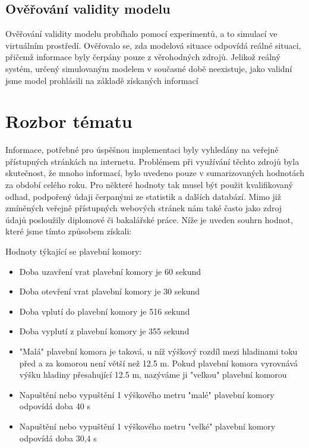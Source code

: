 \documentclass[11pt,a4paper]{article}
\begin{document}
    \subsection{Ověřování validity modelu}

      Ověřování validity modelu probíhalo pomocí experimentů, a to simulací ve virtuálním prostředí. Ověřovalo se,
      zda modelová situace odpovídá reálné situaci, přičemž informace
      byly čerpány pouze z věrohodných zdrojů. Jelikož reálný systém, určený simulovaným modelem v
      současné době neexistuje, jako validní jsme model prohlásili na základě získaných
      informací

  \section{Rozbor tématu}

    Informace, potřebné pro úspěšnou implementaci byly vyhledány na veřejně přístupných stránkách
    na internetu. Problémem při využívání těchto zdrojů byla skutečnost, že mnoho informací,
    bylo uvedeno pouze v sumarizovaných hodnotách za období celého roku. Pro některé hodnoty tak musel být použit kvalifikovaný odhad, podpořený údaji čerpanými ze statistik a dalších databází. Mimo již zmíněných veřejně přístupných webových stránek nám také často jako zdroj údajů posloužily diplomové či bakalářské práce. Níže je uveden souhrn hodnot, které jsme tímto způsobem získali:

    \noindent
    Hodnoty týkající se plavební komory:

    \begin{itemize}
      \item Doba uzavření vrat plavební komory je 60 sekund
      \item Doba otevření vrat plavební komory je 30 sekund
      \item Doba vplutí do plavební komory je 516 sekund
      \item Doba vyplutí z plavební komory je 355 sekund
      \item "Malá" plavební komora je taková, u níž výškový rozdíl mezi hladinami toku před a za komorou není větší než 12.5 m. Pokud plavební komora vyrovnává výšku hladiny přesahující 12.5 m, nazýváme ji "velkou" plavební komorou
      \item Napuštění nebo vypuštění 1 výškového metru "malé" plavební komory odpovídá doba 40 s
      \item Napuštění nebo vypuštění 1 výškového metru  "velké" plavební komory odpovídá doba 30,4 s
    \end{itemize}
\end{document}
